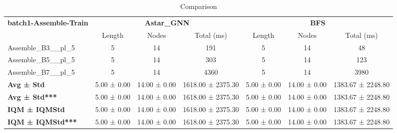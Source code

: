 \begin{table}[!ht]
\centering
\small
\begin{tabular}{l|ccc|ccc}
\multirow{2}{*}{\textbf{batch1-Assemble-Train}} & \multicolumn{3}{c|}{\textbf{Astar\_GNN}} & \multicolumn{3}{c}{\textbf{BFS}} \\
\cline{2-7}
& Length & Nodes & Total (ms) & Length & Nodes & Total (ms) \\
\hline
Assemble\_B3\_\_pl\_5 & 5 & 14 & 191 & 5 & 14 & 48 \\
Assemble\_B5\_\_pl\_5 & 5 & 14 & 303 & 5 & 14 & 123 \\
Assemble\_B7\_\_pl\_5 & 5 & 14 & 4360 & 5 & 14 & 3980 \\
\hline
\textbf{Avg ± Std} & 5.00 ± 0.00 & 14.00 ± 0.00 & 1618.00 ± 2375.30 & 5.00 ± 0.00 & 14.00 ± 0.00 & 1383.67 ± 2248.80 \\
\textbf{Avg ± Std***} & 5.00 ± 0.00 & 14.00 ± 0.00 & 1618.00 ± 2375.30 & 5.00 ± 0.00 & 14.00 ± 0.00 & 1383.67 ± 2248.80 \\
\textbf{IQM ± IQMStd} & 5.00 ± 0.00 & 14.00 ± 0.00 & 1618.00 ± 2375.30 & 5.00 ± 0.00 & 14.00 ± 0.00 & 1383.67 ± 2248.80 \\
\textbf{IQM ± IQMStd***} & 5.00 ± 0.00 & 14.00 ± 0.00 & 1618.00 ± 2375.30 & 5.00 ± 0.00 & 14.00 ± 0.00 & 1383.67 ± 2248.80 \\
\end{tabular}
\caption{Comparison}
\label{tab:batch1_Assemble_comparison_train}
\end{table}
